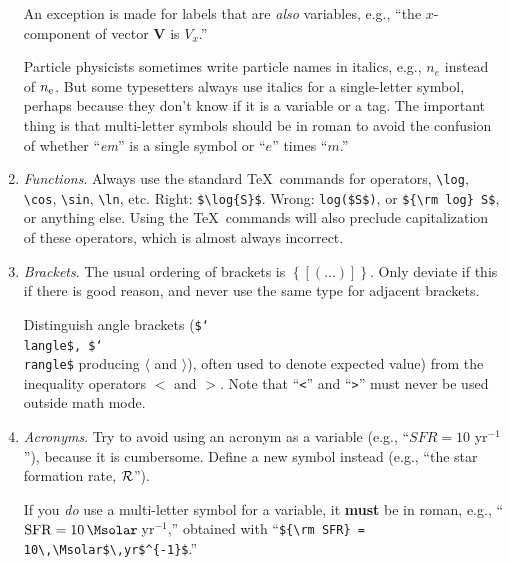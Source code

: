 \documentclass[letterpaper,11pt]{article}
\begin{document}
\begin{enumerate}
An exception is made for labels that are {\it also\/} variables, e.g.,
``the $x$-component of vector {\bf V} %
 is $V_x$.''  

Particle physicists sometimes write particle names in italics, e.g., $n_e$
instead of $n_{\rm e}$.  But some
typesetters always use italics for a single-letter symbol, perhaps because
they don't know if it is a variable or a tag.  The important thing is that
multi-letter symbols should be in roman to avoid the confusion of whether
``{\it em\/}'' is a single symbol or ``$e$'' times ``$m$.''

\item {\it Functions\/}.
Always use the standard \TeX\ commands for operators, \verb|\log|, \verb|\cos|,
\verb|\sin|, \verb|\ln|, etc.  Right: \verb|$\log{S}$|.  Wrong: \verb|log($S$)|, or
\verb|${\rm log} S$|, or anything else.  Using the \TeX\ commands will also
preclude capitalization of these operators, which is almost always incorrect.

%


\item {\it Brackets\/}. The usual ordering of brackets is
$\left\{ \left[ \left( \dots \right) \right] \right\}$.  Only deviate
if this if there is good reason, and never use the same type for adjacent
brackets.

Distinguish angle brackets
({\tt\$\char`\\langle\$, \$\char`\\rangle\$} producing $\langle$ and
$\rangle$), often used to denote expected value) from the inequality operators
$<$ and $>$.  Note that ``{\tt <}'' and ``{\tt >}'' must never be used outside
math mode.

\item {\it Acronyms\/}. Try to avoid using an acronym as a variable
(e.g., ``$SFR = 10$\,\Msolar\,yr$^{-1}$''), because it is cumbersome.  Define a new
symbol instead (e.g., ``the star formation rate, ${\cal R}$'').

If you {\it do\/} use a multi-letter symbol for a variable, it {\bf must}
be in roman, e.g., ``${\rm SFR} = 10\,\Msolar$\,yr$^{-1}$,'' obtained with
``\verb|${\rm SFR} = 10\,\Msolar$\,yr$^{-1}$|.''


\end{enumerate}
\end{document}
